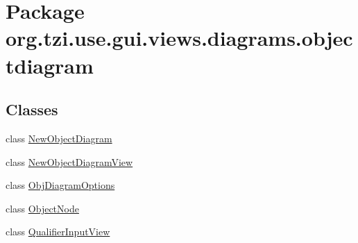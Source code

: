 \hypertarget{namespaceorg_1_1tzi_1_1use_1_1gui_1_1views_1_1diagrams_1_1objectdiagram}{\section{Package org.\-tzi.\-use.\-gui.\-views.\-diagrams.\-objectdiagram}
\label{namespaceorg_1_1tzi_1_1use_1_1gui_1_1views_1_1diagrams_1_1objectdiagram}
}
\subsection*{Classes}
\begin{DoxyCompactItemize}
\item 
class \hyperlink{classorg_1_1tzi_1_1use_1_1gui_1_1views_1_1diagrams_1_1objectdiagram_1_1_new_object_diagram}{New\-Object\-Diagram}
\item 
class \hyperlink{classorg_1_1tzi_1_1use_1_1gui_1_1views_1_1diagrams_1_1objectdiagram_1_1_new_object_diagram_view}{New\-Object\-Diagram\-View}
\item 
class \hyperlink{classorg_1_1tzi_1_1use_1_1gui_1_1views_1_1diagrams_1_1objectdiagram_1_1_obj_diagram_options}{Obj\-Diagram\-Options}
\item 
class \hyperlink{classorg_1_1tzi_1_1use_1_1gui_1_1views_1_1diagrams_1_1objectdiagram_1_1_object_node}{Object\-Node}
\item 
class \hyperlink{classorg_1_1tzi_1_1use_1_1gui_1_1views_1_1diagrams_1_1objectdiagram_1_1_qualifier_input_view}{Qualifier\-Input\-View}
\end{DoxyCompactItemize}
